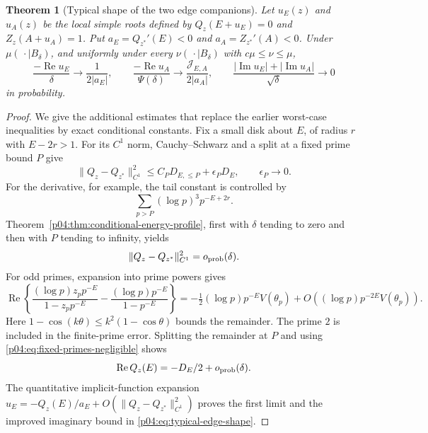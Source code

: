 \documentclass[11pt,letterpaper]{article}
\newtheorem{theorem}{Theorem}[section]
\theoremstyle{definition}
\theoremstyle{remark}
\renewcommand{\Re}{\operatorname{Re}}
\renewcommand{\Im}{\operatorname{Im}}
\newcommand{\1}{\mathbf 1}
\begin{document}
\begin{theorem}[Typical shape of the two edge companions]
\label{p04:thm:typical-edge-shape}
Let $u_E(z)$ and $u_A(z)$ be the local simple roots defined by
$Q_z(E+u_E)=0$ and $Z_z(A+u_A)=1$. Put
$a_E=Q_{z^*}'(E)<0$ and $a_A=Z_{z^*}'(A)<0$.
Under $\mu(\,\cdot\mid B_\delta)$, and uniformly under every
$\nu(\,\cdot\mid B_\delta)$ with $c\mu\le\nu\le\mu$,
\begin{equation}\label{p04:eq:typical-edge-shape}
 \frac{-\Re u_E}{\delta}\longrightarrow\frac1{2|a_E|},
 \qquad
 \frac{-\Re u_A}{\Psi(\delta)}
 \longrightarrow\frac{\mathcal J_{E,A}}{2|a_A|},
 \qquad
 \frac{|\Im u_E|+|\Im u_A|}{\sqrt\delta}\longrightarrow0
\end{equation}
in probability.
\end{theorem}

\begin{proof}
We give the additional estimates that replace the earlier
worst-case inequalities by exact conditional constants. Fix a
small disk about $E$, of radius $r$ with $E-2r>1$. For its
$C^1$ norm, Cauchy--Schwarz and a split at a fixed prime bound $P$
give
\[
 \|Q_z-Q_{z^*}\|_{C^1}^2
 \le C_P D_{E,\le P}+\epsilon_P D_E,
 \qquad \epsilon_P\longrightarrow0.
\]
For the derivative, for example, the tail constant is controlled by
\[
 \sum_{p>P}(\log p)^3p^{-E+2r}.
\]
Theorem~\ref{p04:thm:conditional-energy-profile}, first with $\delta$
tending to zero and then with $P$ tending to infinity, yields
\begin{equation}\label{p04:eq:conditional-C1-small}
 \|Q_z-Q_{z^*}\|_{C^1}^2=o_{\rm prob}(\delta).
\end{equation}
For odd primes, expansion into prime powers gives
\[
 \Re\left\{\frac{(\log p)z_pp^{-E}}{1-z_pp^{-E}}
       -\frac{(\log p)p^{-E}}{1-p^{-E}}\right\}
 =-\tfrac12(\log p)p^{-E}V(\theta_p)
       +O((\log p)p^{-2E}V(\theta_p)).
\]
Here $1-\cos(k\theta)\le k^2(1-\cos\theta)$ bounds the remainder.
The prime $2$ is included in the finite-prime error. Splitting the
remainder at $P$ and using \eqref{p04:eq:fixed-primes-negligible} shows
\[
 \Re Q_z(E)=-D_E/2+o_{\rm prob}(\delta).
\]
The quantitative implicit-function expansion
$u_E=-Q_z(E)/a_E+O(\|Q_z-Q_{z^*}\|_{C^1}^2)$ proves the
first limit and the improved imaginary bound in
\eqref{p04:eq:typical-edge-shape}.


\end{proof}
\end{document}
